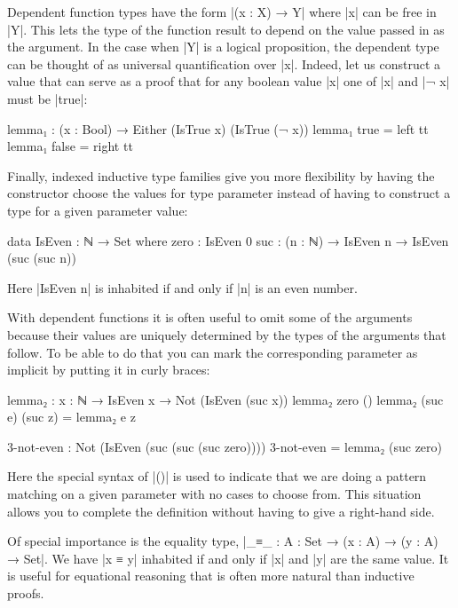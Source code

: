 Dependent function types have the form |(x : X) → Y| where |x| can be free in |Y|. 
This lets the type of the function result to depend on the value passed in as the argument.
In the case when |Y| is a logical proposition, the dependent type can be thought of as universal quantification over |x|.
Indeed, let us construct a value that can serve as a proof that for 
any boolean value |x| one of |x| and |¬ x| must be |true|:

\begin{code}
lemma₁ : (x : Bool) → Either (IsTrue x) (IsTrue (¬ x))
lemma₁ true = left tt
lemma₁ false = right tt
\end{code}

Finally, indexed inductive type families give you more flexibility by having the constructor choose the values for type parameter
instead of having to construct a type for a given parameter value:

\begin{code}
data IsEven : ℕ → Set where
  zero : IsEven 0
  suc : (n : ℕ) → IsEven n → IsEven (suc (suc n))
\end{code}

Here |IsEven n| is inhabited if and only if |n| is an even number.

With dependent functions it is often useful to omit some of the arguments because their values are uniquely 
determined by the types of the arguments that follow. To be able to do that you can mark the corresponding
parameter as implicit by putting it in curly braces:

\begin{code}
  lemma₂ : {x : ℕ} → IsEven x → Not (IsEven (suc x))
  lemma₂ zero () 
  lemma₂ (suc e) (suc z) = lemma₂ e z

  3-not-even : Not (IsEven (suc (suc (suc zero))))
  3-not-even = lemma₂ (suc zero)
\end{code}

Here the special syntax of |()| is used to indicate that we are doing a pattern matching on a given parameter with no cases to choose from.
This situation allows you to complete the definition without having to give a right-hand side.

Of special importance is the equality type, |_≡_ : {A : Set} → (x : A) → (y : A) → Set|. We have |x ≡ y| inhabited if and only if |x| and |y|
are the same value. It is useful for equational reasoning that is often more natural than inductive proofs.


